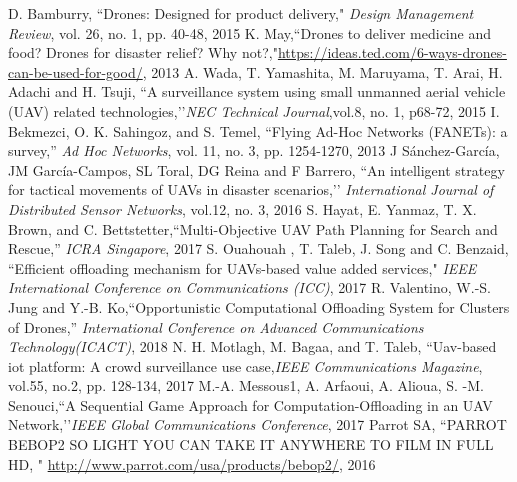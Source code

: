\documentclass{ieeeaccess}
\begin{document}
\begin{thebibliography}{1}
%
 D. Bamburry, ``Drones: Designed for product delivery," \emph{Design Management Review}, vol. 26, no. 1, pp. 40-48, 2015
K. May,``Drones to deliver medicine and food? Drones for disaster relief? Why not?,"\url{https://ideas.ted.com/6-ways-drones-can-be-used-for-good/}, 2013
A. Wada, T. Yamashita, M. Maruyama, T. Arai, H. Adachi and H. Tsuji, ``A surveillance system using small unmanned aerial vehicle (UAV) related technologies,’’\emph{NEC Technical Journal},vol.8, no. 1, p68-72, 2015
 I. Bekmezci, O. K. Sahingoz, and S. Temel, “Flying Ad-Hoc Networks (FANETs): a survey,” \emph{Ad Hoc Networks}, vol. 11, no. 3, pp. 1254-1270, 2013
 J S\'anchez-Garc\'ia, JM Garc\'ia-Campos, SL Toral, DG Reina and F Barrero, ``An intelligent strategy for tactical movements of UAVs in disaster scenarios,’’\emph{
International Journal of Distributed Sensor Networks}, vol.12, no. 3, 2016
S. Hayat, E. Yanmaz, T. X. Brown, and C. Bettstetter,``Multi-Objective UAV Path Planning for Search and Rescue,” \emph{ICRA Singapore}, 2017 
%
%
S. Ouahouah , T. Taleb, J. Song and C. Benzaid, ``Efficient offloading mechanism for UAVs-based value added services," \emph{IEEE International Conference on Communications (ICC)}, 2017
 R. Valentino, W.-S. Jung and Y.-B. Ko,``Opportunistic Computational Offloading System for Clusters of Drones,” \emph{International Conference on Advanced Communications Technology(ICACT)}, 2018 
N. H. Motlagh, M. Bagaa, and T. Taleb, ``Uav-based iot platform: A crowd surveillance use case,\emph{IEEE Communications Magazine}, vol.55, no.2, pp. 128-134, 2017
 M.-A. Messous1, A. Arfaoui, A. Alioua, S. -M. Senouci,``A Sequential Game Approach for Computation-Offloading in an UAV Network,’’\emph{IEEE Global Communications Conference}, 2017 
 Parrot SA, ``PARROT BEBOP2 SO LIGHT YOU CAN TAKE IT
ANYWHERE TO FILM IN FULL HD, "
\url{http://www.parrot.com/usa/products/bebop2/}, 2016


\end{thebibliography}
\end{document}
